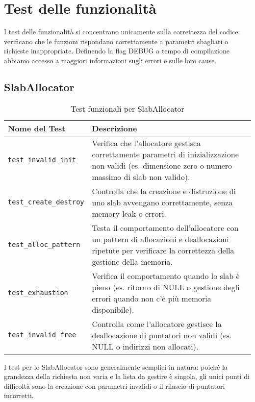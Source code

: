 \pagebreak 

\section{Test delle funzionalità}

I test delle funzionalità si concentrano unicamente sulla correttezza del codice: verificano che le funzioni rispondano correttamente a parametri sbagliati o richieste inappropriate. Definendo la flag DEBUG a tempo di compilazione abbiamo accesso a maggiori informazioni sugli errori e sulle loro cause.

\subsection{SlabAllocator}
\begin{table}[H]
\centering
\begin{tabularx}{\textwidth}{|l|X|}
\hline
\textbf{Nome del Test} & \textbf{Descrizione} \\
\hline
\texttt{test\_invalid\_init} & Verifica che l'allocatore gestisca correttamente parametri di inizializzazione non validi (es. dimensione zero o numero massimo di slab non valido). \\
\hline
\texttt{test\_create\_destroy} & Controlla che la creazione e distruzione di uno slab avvengano correttamente, senza memory leak o errori. \\
\hline
\texttt{test\_alloc\_pattern} & Testa il comportamento dell'allocatore con un pattern di allocazioni e deallocazioni ripetute per verificare la correttezza della gestione della memoria. \\
\hline
\texttt{test\_exhaustion} & Verifica il comportamento quando lo slab è pieno (es. ritorno di NULL o gestione degli errori quando non c'è più memoria disponibile). \\
\hline
\texttt{test\_invalid\_free} & Controlla come l'allocatore gestisce la deallocazione di puntatori non validi (es. NULL o indirizzi non allocati). \\
\hline
\end{tabularx}
\caption{Test funzionali per SlabAllocator}
\end{table}

I test per lo SlabAllocator sono generalmente semplici in natura: poiché la grandezza della richiesta non varia e la lista da gestire è singola, gli unici punti di difficoltà sono la creazione con parametri invalidi o il rilascio di puntatori incorretti.


